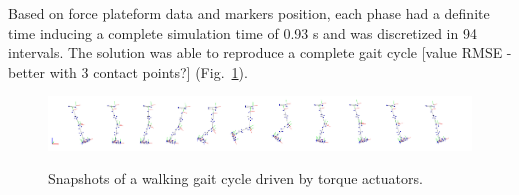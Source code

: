 Based on force plateform data and markers position, each phase had a definite time inducing a complete simulation time of 0.93 s and was discretized in 94 intervals. 
The solution was able to reproduce a complete gait cycle [value RMSE - better with 3 contact points?] (Fig.~\ref{fig:snapshots_multiphase_walking_cycle}). 

\begin{figure}[t!]
\centering
\includegraphics[width=\textwidth]{figures/multiphase_walking_cycle.png}\\
\caption{Snapshots of a walking gait cycle driven by torque actuators.}
\label{fig:snapshots_multiphase_walking_cycle}
\end{figure}

